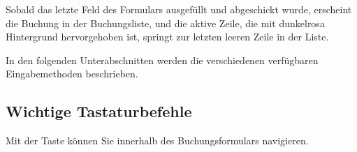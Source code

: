 Sobald das letzte Feld des Formulars ausgefüllt und abgeschickt wurde, erscheint die Buchung in der Buchungsliste, und die aktive Zeile, die mit {\setlength{\fboxsep}{2pt}\colorbox[RGB]{245,155,155}{dunkelrosa Hintergrund}} hervorgehoben ist, springt zur letzten leeren Zeile in der Liste.

In den folgenden Unterabschnitten werden die verschiedenen verfügbaren Eingabemethoden beschrieben.


\subsection{Wichtige Tastaturbefehle\label{transactions-new-keyboard}}

Mit der Taste  können Sie innerhalb des Buchungsformulars navigieren.

